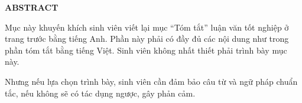 \documentclass[../LuanVan.tex]{subfiles}
\begin{document}
\begin{center}
    \Large{\textbf{ABSTRACT}}\\
\end{center}
\vspace{1cm}
Mục này khuyến khích sinh viên viết lại mục “Tóm tắt” luận văn tốt nghiệp ở trang trước bằng tiếng Anh. Phần này phải có đầy đủ các nội dung như trong phần tóm tắt bằng tiếng Việt.
Sinh viên không nhất thiết phải trình bày mục này. 

Nhưng nếu lựa chọn trình bày, sinh viên cần đảm bảo câu từ và ngữ pháp chuẩn tắc, nếu không sẽ có tác dụng ngược, gây phản cảm.
\end{document}
